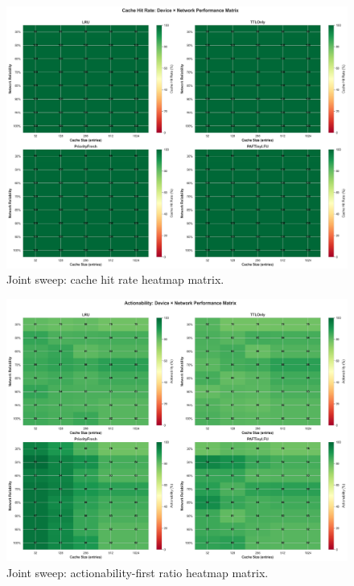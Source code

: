 \documentclass[11pt,twocolumn]{article}
\begin{document}
\begin{figure}[h]
    \centering
    \includegraphics[width=\linewidth]{figures/combined_heatmap_matrix_cacheHitRate.png}
    \caption{Joint sweep: cache hit rate heatmap matrix.}
    \label{fig:combined-heatmap-cachehit}
\end{figure}

\begin{figure}[h]
    \centering
    \includegraphics[width=\linewidth]{figures/combined_heatmap_matrix_actionabilityFirstRatio.png}
    \caption{Joint sweep: actionability-first ratio heatmap matrix.}
    \label{fig:combined-heatmap-actionability}
\end{figure}
\end{document}
